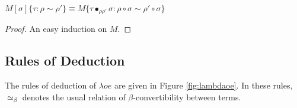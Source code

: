 \documentclass[a4paper,UKenglish]{lipics-v2016}
\theoremstyle{plain}
\begin{document}
\begin{lemma}
\label{lm:pathsubsub}
$M[\sigma]\{ \tau : \rho \sim \rho' \} \equiv
M\{ \tau \bullet_{\rho \rho'} \sigma : \rho \circ \sigma \sim \rho' \circ \sigma \}$
\end{lemma}

\begin{proof}
An easy induction on $M$.
\end{proof}

\subsection{Rules of Deduction}

The rules of deduction of $\lambda o e$ are given in Figure \ref{fig:lambdaoe}.  In these rules, $\simeq_\beta$ denotes the usual relation of $\beta$-convertibility between terms.
\end{document}

